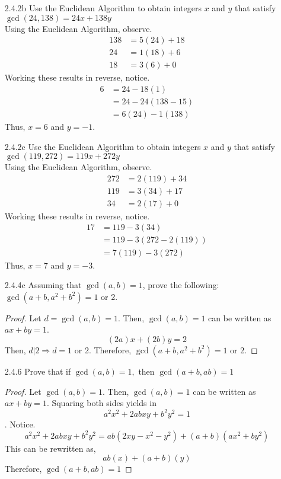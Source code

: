 \documentclass[12pt]{article}
\begin{document}
\begin{enumerate}
	\item[2.4.2b] Use the Euclidean Algorithm to obtain integers $ x $ and $ y $ that satisfy $\gcd(24,138)=24x+138y$\\
	Using the Euclidean Algorithm, observe.
		\begin{align*}
			138 &= 5(24)+18\\
			24 &= 1(18)+6\\
			18 &= 3(6)+0
		\end{align*}
		Working these results in reverse, notice.
		\begin{align*}
			6 &= 24 - 18(1)\\
			  &= 24 - 24(138-15)\\
			  &= 6(24)-1(138)
		\end{align*}
		Thus, $ x=6 $ and $ y= -1 $.
	\item[2.4.2c] Use the Euclidean Algorithm to obtain integers $ x $ and $ y $ that satisfy $\gcd(119,272)=119x+272y$\\	
		Using the Euclidean Algorithm, observe.
		\begin{align*}
			272 &= 2(119)+34\\
			119 &= 3(34)+17\\
			34 &= 2(17)+0
		\end{align*}
		Working these results in reverse, notice.
		\begin{align*}
			 17	&= 119 - 3(34)\\
				&= 119 - 3(272-2(119))\\
				&= 7(119)-3(272)
		\end{align*}
	Thus, $ x=7 $ and $ y= -3 $.
	\item[2.4.4c] Assuming that $ \gcd(a,b)=1 $, prove the following: $ \gcd(a+b,a^2+b^2)=1 $ or 2.\\
		\begin{proof}
			Let $ d=\gcd(a,b)=1 $. Then, $ \gcd(a,b)=1$ can be written as $ax+by=1$.
				\[(2a)x+(2b)y=2\]
			Then, $ d|2 \Rightarrow d = 1$ or 2.
			Therefore,  $ \gcd(a+b,a^2+b^2)=1 $ or 2.
		\end{proof}
	\item[2.4.6] Prove that if $ \gcd(a,b)=1, $ then $ \gcd(a+b,ab)=1 $
		\begin{proof}
			Let $ \gcd(a,b)=1 $. Then, $ \gcd(a,b)=1$ can be written as $ax+by=1$. Squaring both sides yields in \[a^2x^2+2abxy+b^2y^2=1\].
			Notice. 
				\[a^2x^2+2abxy+b^2y^2=ab(2xy-x^2-y^2)+(a+b)(ax^2+by^2)\]
				This can be rewritten as,
				\[ab(x)+(a+b)(y)\]
				Therefore, $ \gcd(a+b,ab)=1 $
		\end{proof}
        
\end{enumerate}
\end{document}
